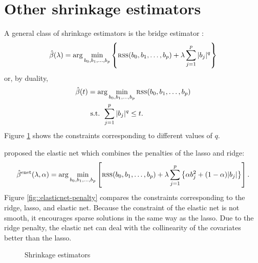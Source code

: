  
 

\section{Other shrinkage estimators}

A general class of shrinkage estimators is the bridge estimator \citep{frank1993statistical}: 
\[
\hat{\beta}(\lambda)=\arg\min_{b_{0},b_{1},\ldots,b_{p}}\left\{ \textsc{rss}(b_0,b_1,\ldots,b_p) +\lambda\sum_{j=1}^{p}|b_{j}|^{q}\right\} 
\]
or, by duality, 
\begin{align*}
\hat{\beta}(t) & =\arg\min_{b_{0},b_{1},\ldots,b_{p}} \textsc{rss}(b_0,b_1,\ldots,b_p)  \\
 & \ \text{s.t. }\sum_{j=1}^{p}|b_{j}|^{q}\ensuremath{\leq t.}
\end{align*}
Figure \ref{fig::general-shrinkage-estimators} shows the constraints corresponding to different values of $q$. 





\citet{zou2005regularization} proposed the elastic net which combines the penalties of the lasso and ridge: 
\[
\hat{\beta}^{\text{enet}}(\lambda,\alpha)=\arg\min_{b_{0},b_{1},\ldots,b_{p}}\left[ \textsc{rss}(b_0,b_1,\ldots,b_p)  +\lambda\sum_{j=1}^{p}\left\{ \alpha b_{j}^{2}+(1-\alpha)|b_{j}|\right\} \right].
\]
Figure \ref{fig::elasticnet-penalty} compares the constraints corresponding to the ridge, lasso, and elastic net. Because the constraint of the elastic net is not smooth, it encourages sparse solutions in the same way as the lasso. Due to the ridge penalty, the elastic net can deal with the collinearity of the covariates better than the lasso. 


\begin{figure}
\centering 
{}
\caption{Shrinkage estimators}\label{fig::general-shrinkage-estimators}
\end{figure}




